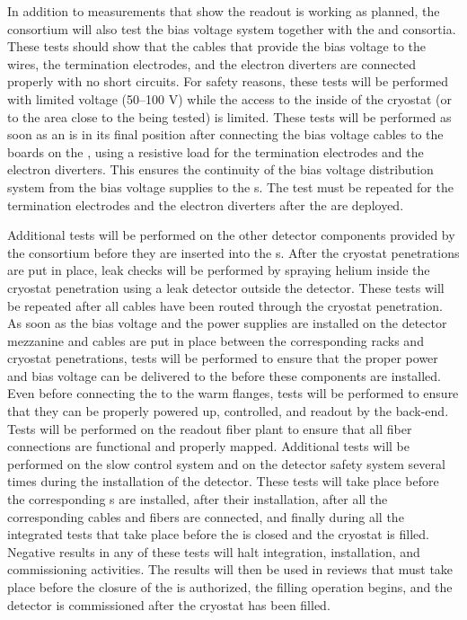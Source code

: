 In addition to measurements that show the 
readout is working as planned, the  consortium will also
test the bias voltage system together with the 
and  consortia. These tests should show that
the cables that provide the bias voltage to the  wires, the
 termination electrodes, and the electron diverters are connected
properly with no short circuits. For safety reasons, these
tests will be performed with limited voltage (50--100 V) while the access
to the inside of the cryostat (or to the area close to the  being
tested) is limited. These tests will be performed as soon as an 
is in its final position after connecting the bias voltage cables to the 
 boards on the , using a resistive load for the 
 termination electrodes and the electron diverters. This ensures
the continuity of the bias voltage distribution system from the bias voltage
supplies to the s. The test must be repeated for the 
termination electrodes and the electron diverters after 
the  are deployed.

Additional tests will be performed on the other detector components
provided by the  consortium before they are inserted into the
s. After the cryostat penetrations are put in place, leak checks
will be performed by spraying helium inside the cryostat penetration using 
a leak detector outside the detector. These tests will be repeated 
after all cables have been routed through the cryostat penetration.
As soon as the bias voltage and the power supplies are installed on the detector
mezzanine and cables are put in place between the corresponding racks and
cryostat penetrations, tests will be performed to ensure that the proper 
power and bias voltage can be delivered to the  before these components
are installed. Even before connecting the  to the warm flanges,
tests will be performed to ensure that they can be properly powered up, controlled,
and readout by the  back-end. Tests will be performed on the
readout fiber plant to ensure that all fiber connections are functional
and properly mapped. Additional tests will be performed on the slow control
system and on the detector safety system several times during the
installation of the detector. These tests will take place before the
corresponding s are installed, after their installation, after
all the corresponding cables and fibers are connected, and finally
during all the integrated tests that take place before
the  is closed and the cryostat is filled. Negative results in any
of these tests will halt integration, installation, and
commissioning activities. The results will then be used in reviews that must
take place before the closure of the  is authorized, the  filling operation begins, and the detector is
commissioned after the cryostat has been filled.

